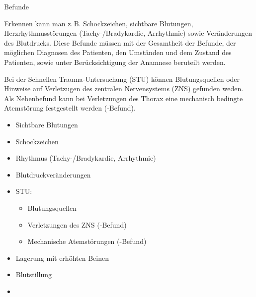 \TextSlide
{{\eye} Befunde}
{Erkennen kann man z.\,B. Schockzeichen,
sichtbare Blutungen, Herzrhythmusstörungen (Tachy-/Bradykardie,
Arrhythmie) sowie Veränderungen des Blutdrucks. Diese
Befunde müssen mit der Gesamtheit der Befunde, der möglichen
Diagnosen des Patienten, den Umständen und dem Zustand
des Patienten, sowie unter Berücksichtigung der Anamnese
beruteilt werden.

Bei der Schnellen Trauma-Untersuchung (STU) können
Blutungsquellen oder Hinweise auf Verletzugen des zentralen
Nervensystems (ZNS) gefunden weden. Als Nebenbefund kann bei
Verletzungen des Thorax eine mechanisch bedingte Atemstörung
festgestellt werden (-Befund).

}{%
\begin{itemize}
  \item Sichtbare Blutungen
  \item Schockzeichen
  \item Rhythmus (Tachy-/Bradykardie, Arrhythmie)
  \item Blutdruckveränderungen
  \item STU: 
  \begin{itemize}
    \item Blutungsquellen
    \item Verletzungen des ZNS (-Befund)
    \item Mechanische Atemstörungen (-Befund)
  \end{itemize}
\end{itemize}
}
{}
{}
{}

% 

{%
\begin{itemize}
  \item Lagerung mit erhöhten Beinen
  \item Blutstillung
  \item \TxMassVit
\end{itemize}
}

